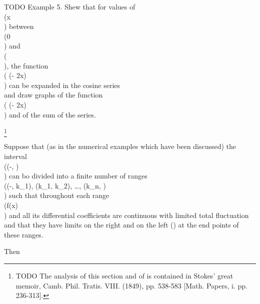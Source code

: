 TODO Example 5. Shew that for values of \\(x\\) between \\(0\\) and \\(\pi\\),
the function \\( \pi (\pi - 2x)\\) can
be expanded in the cosine series
\\[ 
\cos x
+ \frac{\cos 3x}{3^{2}}
+ \frac{\cos 5x}{5^{2}}
+ \cdots,
\\] 
and draw graphs of the function \\( \pi (\pi - 2x)\\) and of the sum of the
series.

\footnote{TODO The analysis of this section and of  is contained in Stokes'
great memoir, Camb. Phil. Tratis. VIII. (1849), pp. 538-583 [Math.
Papers, i. pp. 236-313].}

Suppose that (as in the numerical examples which have been discussed)
the interval \\((-\pi, \pi)\\) can bo divided into a finite number of ranges
\\((-\pi, k_{1}), (k_{1}, k_{2}), \ldots, (k_{n}, \pi)\\)
such that throughout each range \\(f(x)\\)
and all its differential coefficients are continuous with limited
total fluctuation and that they have limits on the right and on the
left () at the end points of these ranges.

Then
\\[ 
\pi a_{m}
=
\int_{-\pi}^{k_{1}}\! f(t) \cos mt \, d t
+ \int_{k_{1}}^{k_{2}}\! f(t) \cos mt \, d t
+ \cdots
+ \int_{k_{n}}^{\pi}\! f(t) \cos mt \, d t.
\\] 

